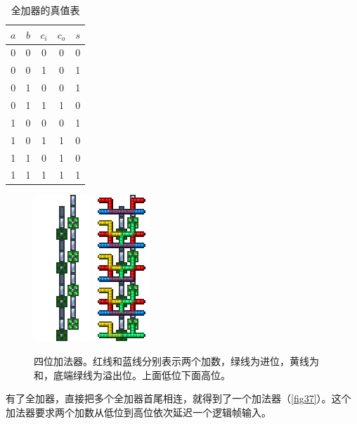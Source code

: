 \begin{table}[!ht]
\centering
\begin{tabular}{ccc|cc}
$a$&$b$&$c_i$&$c_o$&$s$\\\hline
0&0&0&0&0\\
0&0&1&0&1\\
0&1&0&0&1\\
0&1&1&1&0\\
1&0&0&0&1\\
1&0&1&1&0\\
1&1&0&1&0\\
1&1&1&1&1
\end{tabular}
\caption{全加器的真值表}\label{tab1819}
\end{table}

\begin{figure}[!ht]
\centering
\includegraphics{images/408.png}
\qquad
\includegraphics{images/409.png}
\caption{四位加法器。红线和蓝线分别表示两个加数，绿线为进位，黄线为和，底端绿线为溢出位。上面低位下面高位。}\label{fig37}
\end{figure}

有了全加器，直接把多个全加器首尾相连，就得到了一个加法器（\autoref{fig37}）。这个加法器要求两个加数从低位到高位依次延迟一个逻辑帧输入。

